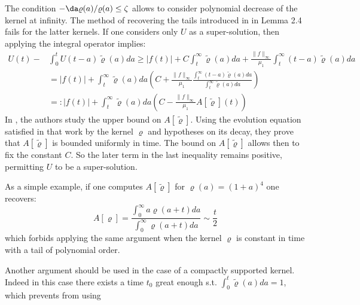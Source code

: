 \documentclass[]{jnsao}
\newcommand{\kernel}{\varrho}
\newcommand{\tkernel}{\tilde{\varrho}}
\begin{document}
 \begin{remark}
 	The condition $-\da \kernel (a) / \kernel(a) \leq \zeta$  allows to consider polynomial decrease of the kernel at infinity. The method of recovering the tails introduced in \cite{MiOel.1}
 	in Lemma 2.4 fails for the latter kernels. If one considers only $U$ as a super-solution, then applying the integral operator implies:
 	$$
 	\begin{aligned}
 		U(t) - &\int_0^t U(t-a) \tkernel(a) da \geq |f(t)| + C \int_t^\infty \tkernel(a) da + \frac{\|f\|_\infty}{\mu_1} \int_t^\infty (t-a) \tkernel(a) da \\
 		& =  |f(t)| + \int_t^\infty \tkernel(a) da \left(C + \frac{\|f\|_\infty}{\mu_1} \frac{\int_t^\infty (t-a) \tkernel(a) da}{\int_t^\infty  \tkernel(a) da} \right)  \\
 			& = :
 			|f(t)| + \int_t^\infty \tkernel(a) da \left(C - \frac{\|f\|_\infty}{\mu_1} A [\tkernel](t) \right) 
 	\end{aligned}
 	$$
 	In \cite[Lemma 2.4]{MiOel.1}, the authors study the upper bound on $A[\tkernel]$. 
	Using the evolution equation satisfied in that work by the kernel $\kernel$ and hypotheses on its decay, 
	they prove that $A[\tkernel]$ is bounded uniformly in time. The bound on $A[\tkernel]$ allows then to fix the constant $C$. 
	So  the later term in the last inequality remains positive, permitting  $U$ to be a super-solution.
 	
 	As a simple example, if one computes $A[\tkernel]$ for $\kernel(a) = (1+a)^{4}$ one recovers:
 	$$
 	A[\kernel] = \frac{\int_0^\infty a \kernel(a+t)da }{\int_0^\infty \kernel(a+t)da} \sim \frac{t}{2}
 	$$
 	which forbids applying the same argument when the kernel $\kernel$ is constant in time with a tail of polynomial order.

 	Another argument should be used in the case of a compactly supported kernel. Indeed in this case there exists a time $t_0$ great enough s.t.
 	$\int_0^{t} \tkernel(a) da = 1$, which prevents from using \cite[Lemma 9.8.2]{grip} 
 \end{remark}
 
 
\end{document}
